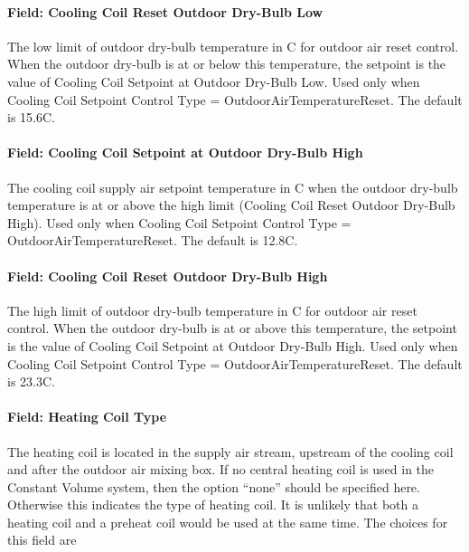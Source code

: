 \paragraph{Field: Cooling Coil Reset Outdoor Dry-Bulb Low}\label{field-cooling-coil-reset-outdoor-dry-bulb-low-1}

The low limit of outdoor dry-bulb temperature in C for outdoor air reset control. When the outdoor dry-bulb is at or below this temperature, the setpoint is the value of Cooling Coil Setpoint at Outdoor Dry-Bulb Low. Used only when Cooling Coil Setpoint Control Type = OutdoorAirTemperatureReset. The default is 15.6C.

\paragraph{Field: Cooling Coil Setpoint at Outdoor Dry-Bulb High}\label{field-cooling-coil-setpoint-at-outdoor-dry-bulb-high-1}

The cooling coil supply air setpoint temperature in C when the outdoor dry-bulb temperature is at or above the high limit (Cooling Coil Reset Outdoor Dry-Bulb High). Used only when Cooling Coil Setpoint Control Type = OutdoorAirTemperatureReset. The default is 12.8C.

\paragraph{Field: Cooling Coil Reset Outdoor Dry-Bulb High}\label{field-cooling-coil-reset-outdoor-dry-bulb-high-1}

The high limit of outdoor dry-bulb temperature in C for outdoor air reset control. When the outdoor dry-bulb is at or above this temperature, the setpoint is the value of Cooling Coil Setpoint at Outdoor Dry-Bulb High. Used only when Cooling Coil Setpoint Control Type = OutdoorAirTemperatureReset. The default is 23.3C.

\paragraph{Field: Heating Coil Type}\label{field-heating-coil-type-7}

The heating coil is located in the supply air stream, upstream of the cooling coil and after the outdoor air mixing box. If no central heating coil is used in the Constant Volume system, then the option ``none'' should be specified here. Otherwise this indicates the type of heating coil. It is unlikely that both a heating coil and a preheat coil would be used at the same time. The choices for this field are

